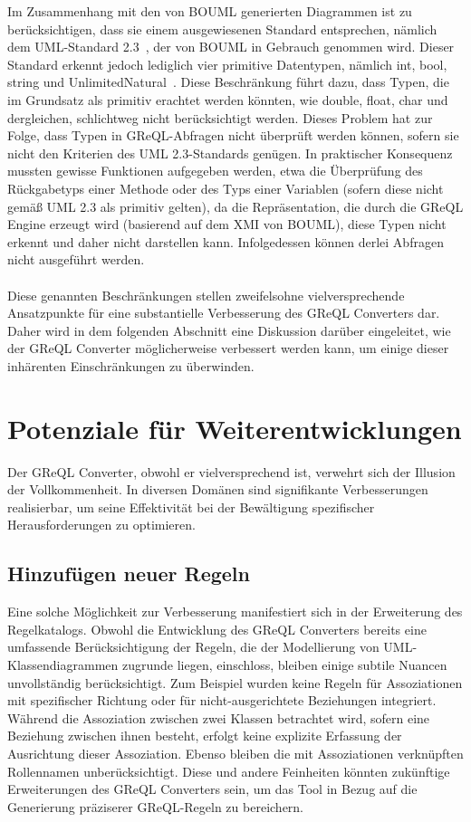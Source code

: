 Im Zusammenhang mit den von BOUML generierten Diagrammen ist zu berücksichtigen, dass sie einem ausgewiesenen Standard
entsprechen, nämlich dem UML-Standard 2.3~\cite{OMG_UML_23_Infrastructure}, der von BOUML in Gebrauch genommen wird.
Dieser Standard erkennt jedoch lediglich vier primitive Datentypen, nämlich int, bool, string und
UnlimitedNatural~\cite{OMG_UML_23_Infrastructure}. Diese Beschränkung führt dazu, dass Typen, die im Grundsatz als
primitiv erachtet werden könnten, wie double, float, char und dergleichen, schlichtweg nicht berücksichtigt werden.
Dieses Problem hat zur Folge, dass Typen in GReQL-Abfragen nicht überprüft werden können, sofern sie nicht den Kriterien
des UML 2.3-Standards genügen. In praktischer Konsequenz mussten gewisse Funktionen aufgegeben werden, etwa die
Überprüfung des Rückgabetyps einer Methode oder des Typs einer Variablen (sofern diese nicht gemäß UML 2.3 als primitiv
gelten), da die Repräsentation, die durch die GReQL Engine erzeugt wird (basierend auf dem XMI von BOUML), diese Typen
nicht erkennt und daher nicht darstellen kann. Infolgedessen können derlei Abfragen nicht ausgeführt werden.
\\~\\
Diese genannten Beschränkungen stellen zweifelsohne vielversprechende Ansatzpunkte für eine substantielle Verbesserung
des GReQL Converters dar. Daher wird in dem folgenden Abschnitt eine Diskussion darüber eingeleitet, wie der GReQL
Converter möglicherweise verbessert werden kann, um einige dieser inhärenten Einschränkungen zu überwinden.


\section{Potenziale für Weiterentwicklungen}

Der GReQL Converter, obwohl er vielversprechend ist, verwehrt sich der Illusion der Vollkommenheit. In diversen Domänen
sind signifikante Verbesserungen realisierbar, um seine Effektivität bei der Bewältigung spezifischer Herausforderungen
zu optimieren.

\subsection{Hinzufügen neuer Regeln}

Eine solche Möglichkeit zur Verbesserung manifestiert sich in der Erweiterung des Regelkatalogs. Obwohl die Entwicklung
des GReQL Converters bereits eine umfassende Berücksichtigung der Regeln, die der Modellierung von UML-Klassendiagrammen
zugrunde liegen, einschloss, bleiben einige subtile Nuancen unvollständig berücksichtigt. Zum Beispiel wurden keine
Regeln für Assoziationen mit spezifischer Richtung oder für nicht-ausgerichtete Beziehungen integriert. Während die
Assoziation zwischen zwei Klassen betrachtet wird, sofern eine Beziehung zwischen ihnen besteht, erfolgt keine explizite
Erfassung der Ausrichtung dieser Assoziation. Ebenso bleiben die mit Assoziationen verknüpften Rollennamen
unberücksichtigt. Diese und andere Feinheiten könnten zukünftige Erweiterungen des GReQL Converters sein, um das Tool
in Bezug auf die Generierung präziserer GReQL-Regeln zu bereichern.


